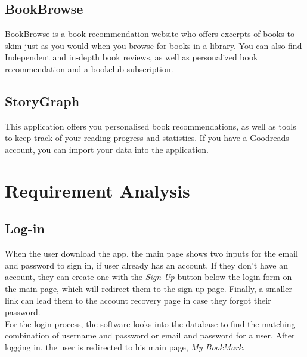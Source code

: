 \documentclass[conference]{IEEEtran}
\begin{document}
\subsection{BookBrowse} 
BookBrowse is a book recommendation website who offers excerpts of books to skim just as you would when you browse for books in a library. You can also find Independent and in-depth book reviews, as well as personalized book recommendation and a bookclub subscription. \cite{Bookbrowse}\\

\subsection{StoryGraph} 
This application offers you personalised book recommendations, as well as tools to keep track of your reading progress and statistics. If you have a Goodreads account, you can import your data into the application. \cite{Storygraph} \\

\section{Requirement Analysis}

\subsection{Log-in}
When the user download the app, the main page shows two inputs for the email and password to sign in, if user already has an account. If they don't have an account, they can create one with the \textit{Sign Up} button below the login form on the main page, which will redirect them to the sign up page. Finally, a smaller link can lead them to the account recovery page in case they forgot their password.\\
For the login process, the software looks into the database to find the matching combination of username and password or email and password for a user. After logging in, the user is redirected to his main page, \textit{My BookMark}.\\
\end{document}
